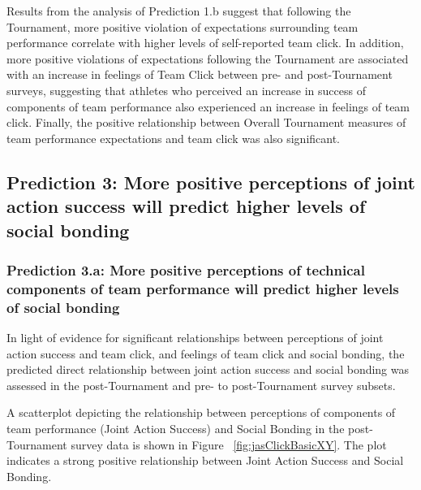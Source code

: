 
   

   


   Results from the analysis of Prediction 1.b suggest that following the Tournament, more positive violation of expectations surrounding team performance correlate with higher levels of self-reported team click.  In addition, more positive violations of expectations following the Tournament are associated with an increase in feelings of Team Click between pre- and post-Tournament surveys, suggesting that athletes who perceived an increase in success of components of team performance also experienced an increase in feelings of team click.  Finally, the positive relationship between Overall Tournament measures of team performance expectations and team click was also significant.






\subsection{Prediction 3: More positive perceptions of joint action success will predict higher levels of social bonding}



\subsubsection{Prediction 3.a: More positive perceptions of technical components of team performance will predict higher levels of social bonding }
In light of evidence for significant relationships between perceptions of joint action success and team click, and feelings of team click and social bonding, the predicted direct relationship between joint action success and social bonding was assessed in the post-Tournament and pre- to post-Tournament survey subsets.

A scatterplot depicting the relationship between perceptions of components of team performance (Joint Action Success) and Social Bonding in the post-Tournament survey data is shown in Figure ~\ref{fig:jasClickBasicXY}. The plot indicates a strong positive relationship between Joint Action Success and Social Bonding.

